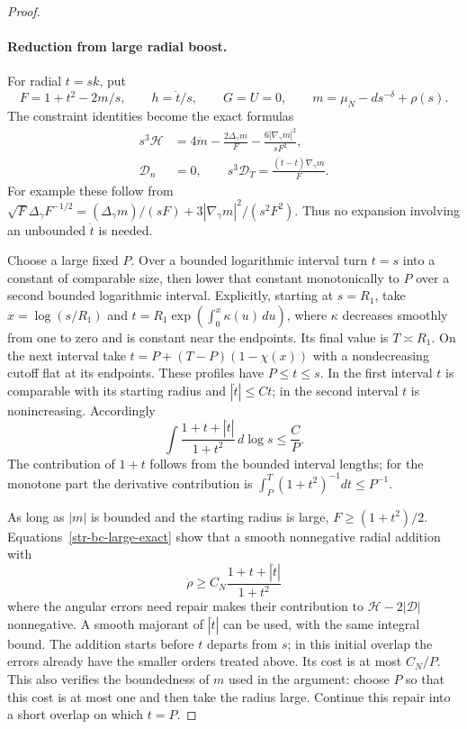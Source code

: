 \begin{proof}
\paragraph{Reduction from large radial boost.}
For radial $t=sk$, put
\[
 F=1+t^2-2m/s,\qquad h=\dot t/s,\qquad G=U=0,
 \qquad m=\mu_N-ds^{-\delta}+\rho(s).
\]
The constraint identities become the exact formulas
\begin{equation}
 \begin{split}
 s^3\mathcal H&=4\dot m-\frac{2\Delta_\gamma m}{F}
           -\frac{6|\nabla_\gamma m|^2}{sF^2},\\
 \mathcal D_n&=0,\qquad
 s^3\mathcal D_T=\frac{(\dot t-t)\nabla_\gamma m}{F}.
 \end{split}
 \label{str-bc-large-exact}
\end{equation}
For example these follow from
$\sqrt F\Delta_\gamma F^{-1/2}
=(\Delta_\gamma m)/(sF)+3|\nabla_\gamma m|^2/(s^2F^2)$.
Thus no expansion involving an unbounded $\dot t$ is needed.

Choose a large fixed $P$. Over a bounded logarithmic interval turn $t=s$
into a constant of comparable size, then lower that constant monotonically
to $P$ over a second bounded logarithmic interval. Explicitly, starting at
$s=R_1$, take $x=\log(s/R_1)$ and
$t=R_1\exp(\int_0^x\kappa(u)\,du)$, where $\kappa$ decreases smoothly
from one to zero and is constant near the endpoints. Its final value is
$T\asymp R_1$. On the next interval take
$t=P+(T-P)(1-\chi(x))$ with a nondecreasing cutoff flat at its endpoints.
These profiles have $P\leq t\leq s$. In the first interval
$t$ is comparable with its starting radius and $|\dot t|\leq Ct$; in the
second interval $t$ is nonincreasing. Accordingly
\begin{equation}
 \int\frac{1+t+|\dot t|}{1+t^2}\,d\log s\leq\frac{C}{P}.
 \label{str-bc-large-cost}
\end{equation}
The contribution of $1+t$ follows from the bounded interval lengths; for
the monotone part the derivative contribution is
$\int_P^T(1+t^2)^{-1}dt\leq P^{-1}$.

As long as $|m|$ is bounded and the starting radius is large,
$F\geq(1+t^2)/2$. Equations~\eqref{str-bc-large-exact} show that a smooth
nonnegative radial addition with
\begin{equation}
 \dot\rho\geq C_N\frac{1+t+|\dot t|}{1+t^2}
 \label{str-bc-large-repair}
\end{equation}
where the angular errors need repair makes their contribution to
$\mathcal H-2|\mathcal D|$ nonnegative. A smooth majorant of $|\dot t|$
can be used, with the same integral bound. The addition starts before $t$
departs from $s$; in this initial overlap the errors already have the smaller
orders treated above. Its cost is at most $C_N/P$. This also verifies the
boundedness of $m$ used in the argument: choose $P$ so that this cost is at
most one and then take the radius large. Continue this repair into a short
overlap on which $t=P$.


\end{proof}
